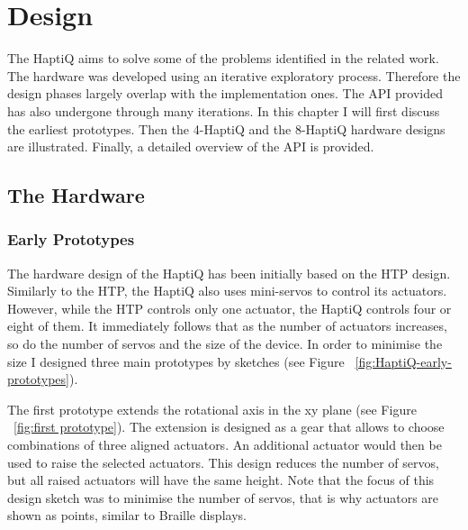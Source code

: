 \chapter{Design}

The HaptiQ aims to solve some of the problems identified in the related work. The hardware was developed using an iterative exploratory process. Therefore the design phases largely overlap with the implementation ones. The API provided has also undergone through many iterations. In this chapter I will first discuss the earliest prototypes. Then the 4-HaptiQ and the 8-HaptiQ hardware designs are illustrated. Finally, a detailed overview of the API is provided.

\section{The Hardware}
\subsection{Early Prototypes}
The hardware design of the HaptiQ has been initially based on the HTP design. Similarly to the HTP, the HaptiQ also uses mini-servos to control its actuators. However, while the HTP controls only one actuator, the HaptiQ controls four or eight of them. It immediately follows that as the number of actuators increases, so do the number of servos and the size of the device. In order to minimise the size I designed three main prototypes by sketches (see Figure ~\ref{fig:HaptiQ-early-prototypes}). 

The first prototype extends the rotational axis in the xy plane (see Figure ~\ref{fig:first prototype}). The extension is designed as a gear that allows to choose combinations of three aligned actuators. An additional actuator would then be used to raise the selected actuators. This design reduces the number of servos, but all raised actuators will have the same height. Note that the focus of this design sketch was to minimise the number of servos, that is why actuators are shown as points, similar to Braille displays.

